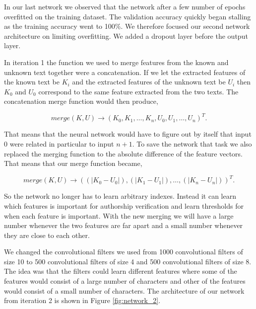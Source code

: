 In our last network we observed that the network after a few number of epochs
overfitted on the training dataset. The validation accuracy quickly began
stalling as the training accuracy went to 100\%. We therefore focused our
second network architecture on limiting overfitting. We added a dropout layer
before the output layer. 

In iteration 1 the function we used to merge features from the known and unknown
text together were a concatenation. If we let the extracted features of the
known text be $K_i$ and the extracted features of the unknown text be $U_i$ then
$K_0$ and $U_0$ correspond to the same feature extracted from the two texts. The
concatenation merge function would then produce,

\begin{equation} merge(K, U) \rightarrow \left(
        K_0, K_1, \dots, K_n, U_0, U_1, \dots, U_n
    \right)^T.
\end{equation}

That means that the neural network would have to figure out by itself that input
$0$ were related in particular to input $n + 1$. To save the network that task
we also replaced the merging function to the absolute difference of the feature
vectors. That means that our merge function became,

\begin{equation}
    merge(K, U) \rightarrow \left(
        (|K_0 - U_0|), (|K_1 - U_1|), \dots, (|K_n - U_n|)
    \right)^T.
\end{equation}

So the network no longer has to learn arbitrary indexes. Instead it can learn
which features is important for authorship verification and learn thresholds for
when each feature is important. With the new merging we will have a large number
whenever the two features are far apart and a small number whenever they are
close to each other.

We changed the convolutional filters we used from 1000 convolutional filters of
size 10 to 500 convolutional filters of size 4 and 500 convolutional filters of
size 8. The idea was that the filters could learn different features where some
of the features would consist of a large number of characters and other of the
features would consist of a small number of characters. The architecture of our
network from iteration 2 is shown in Figure \ref{fig:network_2}.

